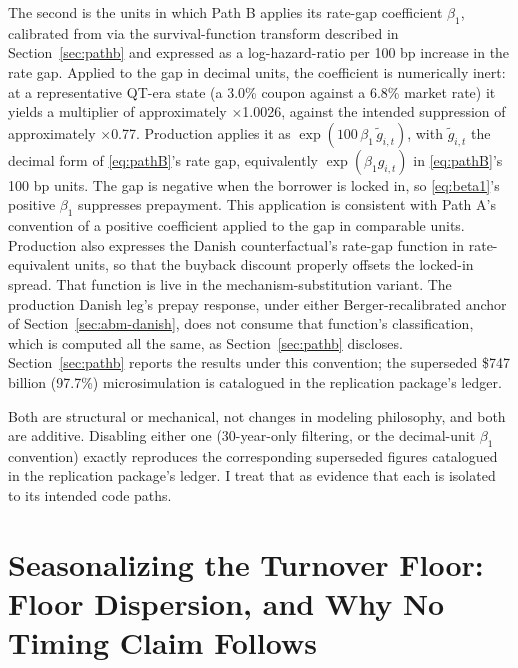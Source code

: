 \documentclass[12pt]{article}
\begin{document}
The second is the units in which Path B applies its rate-gap coefficient $\beta_1$, calibrated from \citet{liebersohn2024} via the survival-function transform described in Section~\ref{sec:pathb} and expressed as a log-hazard-ratio per 100 bp increase in the rate gap. Applied to the gap in decimal units, the coefficient is numerically inert: at a representative QT-era state (a 3.0\% coupon against a 6.8\% market rate) it yields a multiplier of approximately $\times$1.0026, against the intended suppression of approximately $\times$0.77. Production applies it as $\exp(100\,\beta_1\,\tilde g_{i,t})$, with $\tilde g_{i,t}$ the decimal form of \eqref{eq:pathB}'s rate gap, equivalently $\exp(\beta_1 g_{i,t})$ in \eqref{eq:pathB}'s 100 bp units. The gap is negative when the borrower is locked in, so \eqref{eq:beta1}'s positive $\beta_1$ suppresses prepayment. This application is consistent with Path A's convention of a positive coefficient applied to the gap in comparable units. Production also expresses the Danish counterfactual's rate-gap function in rate-equivalent units, so that the buyback discount properly offsets the locked-in spread. That function is live in the mechanism-substitution variant. The production Danish leg's prepay response, under either Berger-recalibrated anchor of Section~\ref{sec:abm-danish}, does not consume that function's classification, which is computed all the same, as Section~\ref{sec:pathb} discloses. Section~\ref{sec:pathb} reports the results under this convention; the superseded \$747 billion (97.7\%) microsimulation is catalogued in the replication package's ledger.

Both are structural or mechanical, not changes in modeling philosophy, and both are additive. Disabling either one (30-year-only filtering, or the decimal-unit $\beta_1$ convention) exactly reproduces the corresponding superseded figures catalogued in the replication package's ledger. I treat that as evidence that each is isolated to its intended code paths.

\section{Seasonalizing the Turnover Floor: Floor Dispersion, and Why No Timing Claim Follows}\label{sec:robustness-seasonalfloor}
\end{document}
